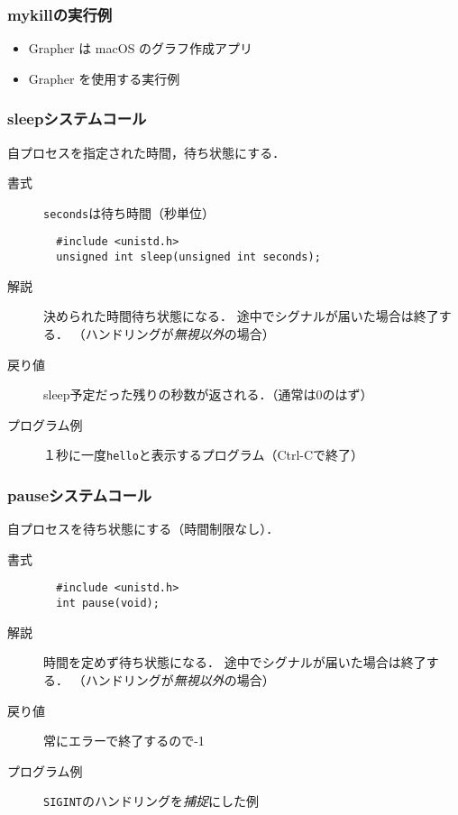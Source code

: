 \documentclass{beamer}                 %
\begin{document}
\begin{frame}[fragile]
  \frametitle{mykillの実行例}
  \begin{quote}
  \end{quote}

  \begin{itemize}
  \item Grapher は macOS のグラフ作成アプリ
  \item Grapher を使用する実行例
  \end{itemize}
\end{frame}

\begin{frame}[fragile]
  \frametitle{sleepシステムコール}
  自プロセスを指定された時間，待ち状態にする．

  \begin{description}
  \item[書式] \texttt{seconds}は待ち時間（秒単位）

\begin{verbatim}
  #include <unistd.h>
  unsigned int sleep(unsigned int seconds);
\end{verbatim}

  \item[解説]
    決められた時間待ち状態になる．
    途中でシグナルが届いた場合は終了する．
    （ハンドリングが\emph{無視以外}の場合）

  \item[戻り値]
    sleep予定だった残りの秒数が返される．（通常は0のはず）
  
  \item[プログラム例]
    １秒に一度\texttt{hello}と表示するプログラム（Ctrl-Cで終了）
  \end{description}
\end{frame}

\begin{frame}[fragile]
  \frametitle{pauseシステムコール}
  自プロセスを待ち状態にする（時間制限なし）．

  \begin{description}
  \item[書式]
\begin{verbatim}
  #include <unistd.h>
  int pause(void);
\end{verbatim}

  \item[解説]
    時間を定めず待ち状態になる．
    途中でシグナルが届いた場合は終了する．
    （ハンドリングが\emph{無視以外}の場合）

  \item[戻り値]
    常にエラーで終了するので-1
  
  \item[プログラム例] \texttt{SIGINT}のハンドリングを\emph{捕捉}にした例
  \end{description}
\end{frame}
\end{document}

